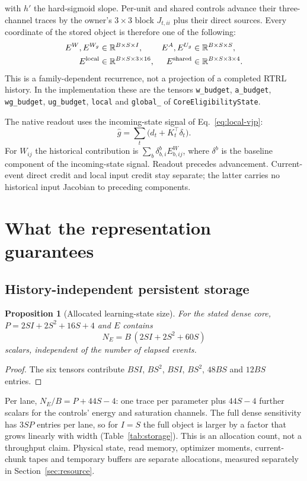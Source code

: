 \documentclass[11pt]{article}
\newtheorem{proposition}[theorem]{Proposition}
\theoremstyle{definition}
\newcommand{\R}{\mathbb R}
\begin{document}
with $h'$ the hard-sigmoid slope. Per-unit and shared controls advance their
three-channel traces by the owner's $3\times3$ block $J_{t,ii}$ plus their direct
sources. Every coordinate of the stored object is therefore one of the following:
\begin{align}
 E^W,E^{W_g}&\in\R^{B\times S\times I}, &
 E^A,E^{U_g}&\in\R^{B\times S\times S},\\
 E^{\rm local}&\in\R^{B\times S\times3\times16}, &
 E^{\rm shared}&\in\R^{B\times S\times3\times4}.
\end{align}
This is a family-dependent recurrence, not a projection of a completed RTRL
history. In the implementation these are the tensors \texttt{w\_budget},
\texttt{a\_budget}, \texttt{wg\_budget}, \texttt{ug\_budget}, \texttt{local} and
\texttt{global\_} of \texttt{CoreEligibilityState}.

The native readout uses the incoming-state signal of
Eq.~\eqref{eq:local-vjp}:
\begin{equation}
 \widehat g=\sum_t\big(d_t+K_t^\top\delta_t\big).
 \label{eq:readout}
\end{equation}
For $W_{ij}$ the historical contribution is $\sum_b\delta^{b}_{b,i}E^W_{b,ij}$,
where $\delta^b$ is the baseline component of the incoming-state signal. Readout
precedes advancement. Current-event direct credit and local input credit stay
separate; the latter carries no historical input Jacobian to preceding
components.

\section{What the representation guarantees}
\label{sec:theory}

\subsection{History-independent persistent storage}
\label{sec:storage}
\begin{proposition}[Allocated learning-state size]
\label{prop:storage}
For the stated dense core, $P=2SI+2S^2+16S+4$ and $E$ contains
\begin{equation}
 N_E=B\,(2SI+2S^2+60S)
 \label{eq:storage}
\end{equation}
scalars, independent of the number of elapsed events.
\end{proposition}
\begin{proof}
The six tensors contribute $BSI$, $BS^2$, $BSI$, $BS^2$, $48BS$ and $12BS$
entries.
\end{proof}
Per lane, $N_E/B=P+44S-4$: one trace per parameter plus $44S-4$ further scalars
for the controls' energy and saturation channels. The full dense sensitivity has
$3SP$ entries per lane, so for $I=S$ the full object is larger by a factor that
grows linearly with width (Table~\ref{tab:storage}). This is an allocation count,
not a throughput claim. Physical state, read memory, optimizer moments,
current-chunk tapes and temporary buffers are separate allocations, measured
separately in Section~\ref{sec:resource}.
\end{document}

